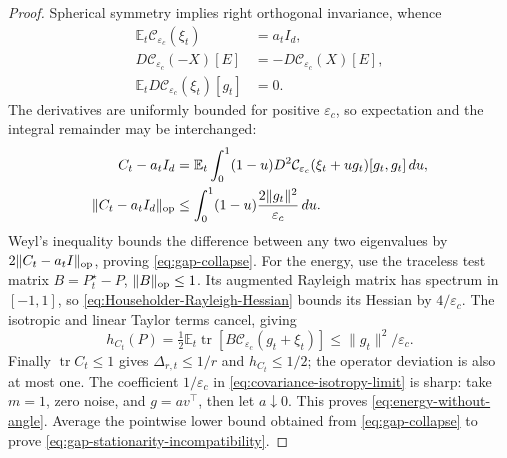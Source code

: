 \begin{proof}
Spherical symmetry implies right orthogonal invariance, whence
\begin{align}
 \mathbb E_t\mathcal C_{\varepsilon_c}(\xi_t)&=a_tI_d,\\
 D\mathcal C_{\varepsilon_c}(-X)[E]&=-D\mathcal C_{\varepsilon_c}(X)[E],\\
 \mathbb E_tD\mathcal C_{\varepsilon_c}(\xi_t)[g_t]&=0.
\end{align}
The derivatives are uniformly bounded for positive $\varepsilon_c$, so
expectation and the integral remainder may be interchanged:
\begin{align}
 C_t-a_tI_d
 &=\mathbb E_t\int_0^1(1-u)
       D^2\mathcal C_{\varepsilon_c}(\xi_t+ug_t)[g_t,g_t]\,du,\\
 \|C_t-a_tI_d\|_{\rm op}&\le\int_0^1(1-u)\frac{2\|g_t\|^2}{\varepsilon_c}\,du.
\end{align}
Weyl's inequality bounds the difference between any two eigenvalues by
$2\|C_t-a_tI\|_{\rm op}$, proving \eqref{eq:gap-collapse}.
For the energy, use the traceless test matrix $B=P_t^\star-P$,
$\|B\|_{\rm op}\le1$. Its augmented Rayleigh matrix has spectrum in
$[-1,1]$, so \eqref{eq:Householder-Rayleigh-Hessian} bounds its Hessian
by $4/\varepsilon_c$. The isotropic and linear Taylor terms cancel, giving
\begin{equation}
 h_{C_t}(P)=\tfrac12\mathbb E_t\operatorname{tr}
                 [B\mathcal C_{\varepsilon_c}(g_t+\xi_t)]
                         \le\|g_t\|^2/\varepsilon_c.
\end{equation}
Finally $\operatorname{tr}C_t\le1$ gives
$\Delta_{r,t}\le1/r$ and $h_{C_t}\le1/2$; the operator deviation is also
at most one.
The coefficient $1/\varepsilon_c$ in \eqref{eq:covariance-isotropy-limit}
is sharp: take $m=1$, zero noise, and $g=av^\top$, then let $a\downarrow0$.
This proves \eqref{eq:energy-without-angle}. Average the pointwise lower
bound obtained from \eqref{eq:gap-collapse} to prove
\eqref{eq:gap-stationarity-incompatibility}.
\end{proof}

